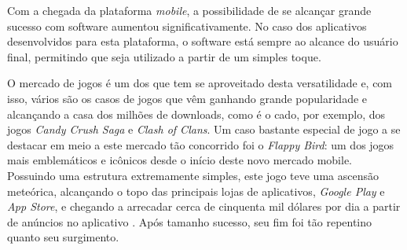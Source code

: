 Com a chegada da plataforma \textit{mobile}, a possibilidade de se alcançar grande sucesso com software aumentou significativamente. No caso dos aplicativos desenvolvidos para esta plataforma, o software está sempre ao alcance do usuário final, permitindo que seja utilizado a partir de um simples toque.

O mercado de jogos é um dos que tem se aproveitado desta versatilidade e, com isso, vários são os casos de jogos que vêm ganhando grande popularidade e alcançando a casa dos milhões de downloads, como é o cado, por exemplo, dos jogos \textit{Candy Crush Saga} e \textit{Clash of Clans}. Um caso bastante especial de jogo a se destacar em meio a este mercado tão concorrido foi o \textit{Flappy Bird}: um dos jogos mais emblemáticos e icônicos desde o início deste novo mercado mobile. Possuindo uma estrutura extremamente simples, este jogo teve uma ascensão meteórica, alcançando o topo das principais lojas de aplicativos, \textit{Google Play} e \textit{App Store}, e chegando a arrecadar cerca de cinquenta mil dólares por dia a partir de anúncios no aplicativo \cite{Warren2014}. Após tamanho sucesso, seu fim foi tão repentino quanto seu surgimento.




